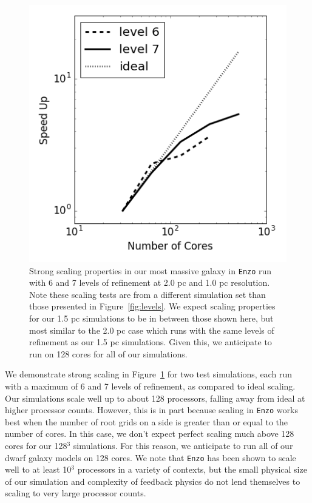 \documentclass[11pt]{article}
\begin{document}
\begin{figure}
\centering
\includegraphics[width=0.32\linewidth]{enzo_scaling}

\caption{\small Strong scaling properties in our most massive galaxy in \texttt{Enzo} run with 6 and 7 levels of refinement at 2.0 pc and 1.0 pc resolution. Note these scaling tests are from a different simulation set than those presented in Figure~\ref{fig:levels}. We expect scaling properties for our 1.5 pc simulations to be in between those shown here, but most similar to the 2.0 pc case which runs with the same levels of refinement as our 1.5 pc simulations. Given this, we anticipate to run on 128 cores for all of our simulations.}
\label{fig:radiation_and_scaling}
\end{figure}

We demonstrate strong scaling in Figure~\ref{fig:radiation_and_scaling} for two test simulations, each run with a maximum of 6 and 7 levels of refinement, as compared to ideal scaling. Our simulations scale well up to about 128 processors, falling away from ideal at higher processor counts. However, this is in part because scaling in \texttt{Enzo} works best when the number of root grids on a side is greater than or equal to the number of cores. In this case, we don't expect perfect scaling much above 128 cores for our 128$^3$ simulations. For this reason, we anticipate to run all of our dwarf galaxy models on 128 cores. We note that \texttt{Enzo} has been shown to scale well to at least 10$^3$ processors in a variety of contexts, but the small physical size of our simulation and complexity of feedback physics do not lend themselves to scaling to very large processor counts.

\clearpage


\end{document}
